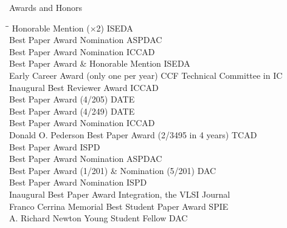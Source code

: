 
\begin{rSection}{Awards and Honors}
\begin{tabbing}
\hspace{3.8in}\= \hspace{2.6in}\= \kill
Honorable Mention ($\times$2) \> ISEDA  \\
Best Paper Award Nomination \> ASPDAC  \\
Best Paper Award Nomination \> ICCAD  \\
Best Paper Award \& Honorable Mention \> ISEDA  \\
Early Career Award (only one per year) \> CCF Technical Committee in IC  \\
Inaugural Best Reviewer Award \> ICCAD  \\
Best Paper Award (4/205) \> DATE  \\
Best Paper Award (4/249) \> DATE  \\
Best Paper Award Nomination \> ICCAD  \\
Donald O. Pederson Best Paper Award (2/3495 in 4 years) \> TCAD  \\
Best Paper Award \> ISPD  \\
Best Paper Award Nomination \> ASPDAC  \\
Best Paper Award (1/201) \& Nomination (5/201) \> DAC  \\
Best Paper Award Nomination \> ISPD  \\
Inaugural Best Paper Award \> Integration, the VLSI Journal  \\
Franco Cerrina Memorial Best Student Paper Award \> SPIE  \\
A. Richard Newton Young Student Fellow \> DAC  \\
\end{tabbing}
\end{rSection}

